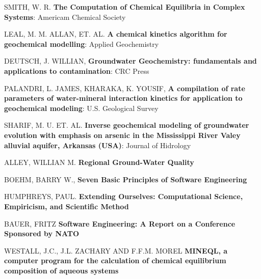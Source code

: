 \documentclass[ppgc,mestrado,english]{iiufrgs}
\begin{document}
\begin{thebibliography}{este-parametro-nao-eh-usado-pelo-estilo-ABNT}
 SMITH, W. R. 
\textbf{The Computation of Chemical Equilibria in Complex Systems}: Americam Chemical Society

 LEAL, M. M. ALLAN, ET. AL.
\textbf{A chemical kinetics algorithm for geochemical modelling}: Applied Geochemistry

 DEUTSCH, J. WILLIAN,
\textbf{Groundwater Geochemistry: fundamentals and applications to contamination}: CRC Press

 PALANDRI, L. JAMES, KHARAKA, K. YOUSIF,
\textbf{A compilation of rate parameters of water-mineral interaction kinetics for application to geochemical modeling}: U.S. Geological Survey

 SHARIF, M. U. ET. AL. 
\textbf{Inverse geochemical modeling of groundwater evolution with emphasis on arsenic in the Mississippi River Valey alluvial aquifer, Arkansas (USA)}: Journal of Hidrology

 ALLEY, WILLIAN M.
\textbf{Regional Ground-Water Quality}

 BOEHM, BARRY W.,
\textbf{Seven Basic Principles of Software Engineering}

 HUMPHREYS, PAUL.
\textbf{Extending Ourselves: Computational Science, Empiricism, and Scientific Method}

 BAUER, FRITZ
\textbf{Software Engineering: A Report on a Conference Sponsored by NATO}

 WESTALL, J.C., J.L. ZACHARY AND F.F.M. MOREL
\textbf{MINEQL, a computer program for the calculation of chemical equilibrium composition of aqueous systems}


\end{thebibliography}
\end{document}
